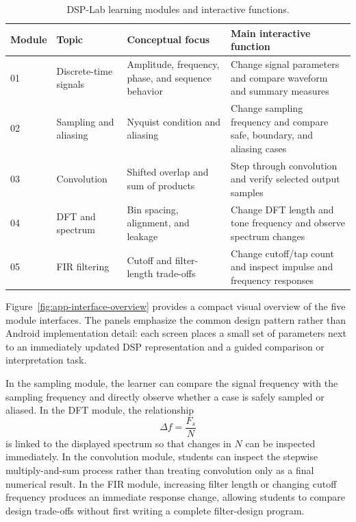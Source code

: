 \documentclass[11pt,a4paper]{article}
\begin{document}
\begin{table}[htbp]
\centering
\caption{DSP-Lab learning modules and interactive functions.}
\label{tab:modules}
\begin{tabular}{p{}p{}p{}p{}}
\toprule
Module & Topic & Conceptual focus & Main interactive function \\
\midrule
01 & Discrete-time signals & Amplitude, frequency, phase, and sequence behavior & Change signal parameters and compare waveform and summary measures \\
02 & Sampling and aliasing & Nyquist condition and aliasing & Change sampling frequency and compare safe, boundary, and aliasing cases \\
03 & Convolution & Shifted overlap and sum of products & Step through convolution and verify selected output samples \\
04 & DFT and spectrum & Bin spacing, alignment, and leakage & Change DFT length and tone frequency and observe spectrum changes \\
05 & FIR filtering & Cutoff and filter-length trade-offs & Change cutoff/tap count and inspect impulse and frequency responses \\
\bottomrule
\end{tabular}
\end{table}

Figure~\ref{fig:app-interface-overview} provides a compact visual overview of the five module interfaces. The panels emphasize the common design pattern rather than Android implementation detail: each screen places a small set of parameters next to an immediately updated DSP representation and a guided comparison or interpretation task.



In the sampling module, the learner can compare the signal frequency with the sampling frequency and directly observe whether a case is safely sampled or aliased. In the DFT module, the relationship
\begin{equation}
\Delta f = \frac{F_s}{N}
\end{equation}
is linked to the displayed spectrum so that changes in $N$ can be inspected immediately. In the convolution module, students can inspect the stepwise multiply-and-sum process rather than treating convolution only as a final numerical result. In the FIR module, increasing filter length or changing cutoff frequency produces an immediate response change, allowing students to compare design trade-offs without first writing a complete filter-design program.
\end{document}
